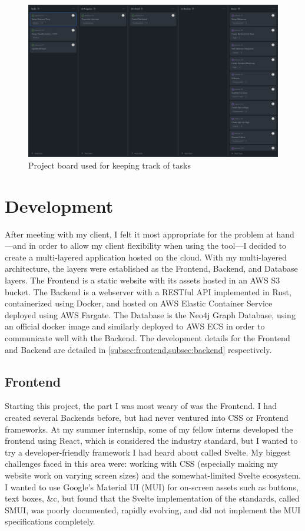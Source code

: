 \documentclass{paper}
\begin{document}
\begin{figure}
  \includegraphics[width=\linewidth]{Github-Project-Board}
  \caption{Project board used for keeping track of tasks}
  \label{design:project_board}
\end{figure}

\section{Development}
\label{sec:develop}
After meeting with my client, I felt it most appropriate for the problem at hand---and in order to allow my client flexibility when using the tool---I decided to create a multi-layered application hosted on the cloud.
With my multi-layered architecture, the layers were established as the Frontend, Backend, and Database layers.
The Frontend is a static website with its assets hosted in an AWS S3 bucket.
The Backend is a webserver with a RESTful API implemented in Rust, containerized using Docker, and hosted on AWS Elastic Container Service deployed using AWS Fargate.
The Database is the Neo4j Graph Database, using an official docker image and similarly deployed to AWS ECS in order to communicate well with the Backend.
The development details for the Frontend and Backend are detailed in \cref{subsec:frontend,subsec:backend} respectively.

\subsection{Frontend}
\label{subsec:frontend}
Starting this project, the part I was most weary of was the Frontend.
I had created several Backends before, but had never ventured into CSS or Frontend frameworks.
At my summer internship, some of my fellow interns developed the frontend using React, which is considered the industry standard, but I wanted to try a developer-friendly framework I had heard about called Svelte.
My biggest challenges faced in this area were: working with CSS (especially making my website work on varying screen sizes) and the somewhat-limited Svelte ecosystem.
I wanted to use Google's Material UI (MUI) for on-screen assets such as buttons, text boxes, \&c, but found that the Svelte implementation of the standards, called SMUI, was poorly documented, rapidly evolving, and did not implement the MUI specifications completely.
\end{document}
